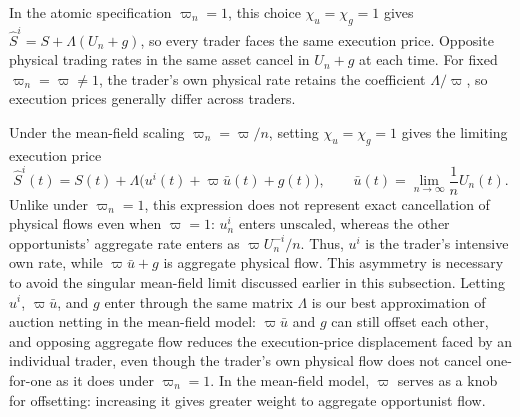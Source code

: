 \documentclass[12pt]{article}
\numberwithin{equation}{section}
\theoremstyle{definition}
\begin{document}
In the atomic specification \(\varpi_n=1\), this choice $\chi_u=\chi_g=1$ gives
$\widehat S^i=S+\Lambda(U_n+g)$, so every trader faces the same execution price.
Opposite physical trading rates in the same asset cancel
in $U_n+g$ at each time.
For fixed $\varpi_n=\varpi\ne1$, the trader's own physical rate retains the
coefficient $\Lambda/\varpi$, so execution prices generally differ across traders.

Under the mean-field scaling \(\varpi_n=\varpi/n\), setting
$\chi_u=\chi_g=1$ gives the limiting execution price
\[
\widehat S^i(t)
=
S(t)
+
\Lambda\bigl(
u^i(t)+\varpi\bar u(t)+g(t)
\bigr),
\qquad
\bar u(t)
=
\lim_{n\to\infty}\frac{1}{n}U_n(t).
\]
Unlike under \(\varpi_n=1\), this expression does not represent exact
cancellation of physical flows even when \(\varpi=1\): $u_n^i$ enters
unscaled, whereas the other opportunists' aggregate rate enters as
$\varpi U_n^{-i}/n$. Thus, $u^i$ is the trader's intensive own rate, while
$\varpi\bar u+g$ is aggregate physical flow. This asymmetry is necessary to avoid the
singular mean-field limit discussed earlier in this subsection. Letting
$u^i$, $\varpi\bar u$, and $g$ enter through the same matrix $\Lambda$ is our best
approximation of auction netting in the mean-field model: $\varpi\bar u$ and $g$ can
still offset each other, and opposing aggregate flow reduces the execution-price
displacement faced by an individual trader, even though the trader's own
physical flow does not cancel one-for-one as it does under \(\varpi_n=1\).
In the mean-field model, $\varpi$ serves as a knob for offsetting: increasing
it gives greater weight to aggregate opportunist flow.
\end{document}
